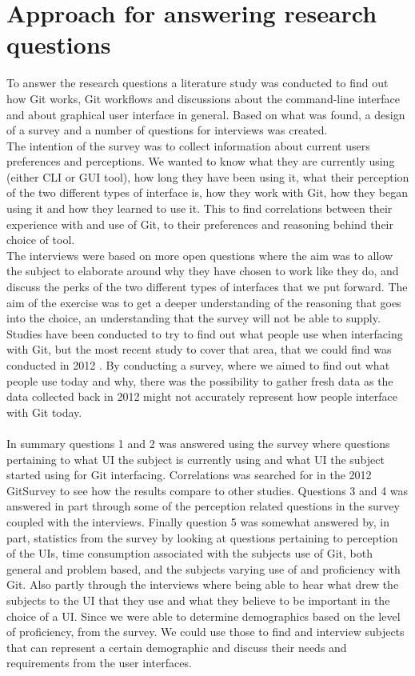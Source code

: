 \documentclass[a4paper,oneside]{bth} %
\begin{document}
			\section{Approach for answering research questions}
			To answer the research questions a literature study was conducted to find out how Git works, Git workflows and discussions about the command-line interface and about graphical user interface in general. Based on what was found, a design of a survey and a number of questions for interviews was created.\\
			The intention of the survey was to collect information about current users preferences and perceptions. We wanted to know what they are currently using (either CLI or GUI tool), how long they have been using it, what their perception of the two different types of interface is, how they work with Git, how they began using it and how they learned to use it. This to find correlations between their experience with and use of Git, to their preferences and reasoning behind their choice of tool.\\
			The interviews were based on more open questions where the aim was to allow the subject to elaborate around why they have chosen to work like they do, and discuss the perks of the two different types of interfaces that we put forward. The aim of the exercise was to get a deeper understanding of the reasoning that goes into the choice, an understanding that the survey will not be able to supply.\\
			Studies have been conducted to try to find out what people use when interfacing with Git, but the most recent study to cover that area, that we could find was conducted in 2012 \cite{GitUserSurvey}.
			By conducting a survey, where we aimed to find out what people use today and why, there was the possibility to gather fresh data as the data collected back in 2012 might not accurately represent how people interface with Git today.
			\\\\
			In summary questions 1 and 2 was answered using the survey where questions pertaining to what UI the subject is currently using and what UI the subject started using for Git interfacing. Correlations was searched for in the 2012 GitSurvey \cite{GitUserSurvey} to see how the results compare to other studies.
			Questions 3 and 4 was answered in part through some of the perception related questions in the survey coupled with the interviews. Finally question 5 was somewhat answered by, in part, statistics from the survey by looking at questions pertaining to perception of the UIs, time consumption associated with the subjects use of Git, both general and problem based, and the subjects varying use of and proficiency with Git. Also partly through the interviews where being able to hear what drew the subjects to the UI that they use and what they believe to be important in the choice of a UI. Since we were able to determine demographics based on the level of proficiency, from the survey. We could use those to find and interview subjects that can represent a certain demographic and discuss their needs and requirements from the user interfaces. 
\end{document}
